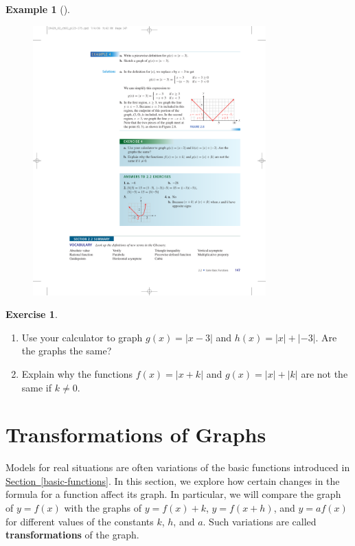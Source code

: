 \documentclass[10pt,]{book}
\newcommand{\terminology}[1]{\textbf{#1}}
\theoremstyle{plain}
\theoremstyle{definition}
\theoremstyle{definition}
\theoremstyle{definition}
\newtheorem{example}[theorem]{Example}
\theoremstyle{definition}
\theoremstyle{definition}
\newtheorem{exercise}[theorem]{Exercise}
\numberwithin{equation}{section}
\newcommand\abs[1]{\left|#1\right|}
\begin{document}
\begin{example}[]
\begin{enumerate}[label=*\alph**]
            \leavevmode%
\begin{figure}
\centering
\includegraphics[width=0.80\textwidth,]{images/fig-piecewise2.pdf}\caption{\label{fig-piecewise2}}
\end{figure}
\end{enumerate}
\end{example}
\begin{exercise}\label{exercise-piecewise2}
\leavevmode%
\begin{enumerate}[label=*\alph**]
\item\hypertarget{li-284}{}Use your calculator to graph \(g(x) =\abs{x−3}\) and \(h(x) =\abs{x} + \abs{−3}\). Are the graphs the same?\item\hypertarget{li-285}{}Explain why the functions \(f (x) =\abs{x + k}\) and \(g(x) =\abs{x} + \abs{k}\) are not the same if \(k\ne 0\).
        \end{enumerate}
\end{exercise}
\typeout{************************************************}
\typeout{************************************************}
\section[Transformations of Graphs]{Transformations of Graphs}\label{transformations}

    Models for real situations are often variations of the basic functions introduced in \hyperref[basic-functions]{Section~\ref{basic-functions}}. In this section, we explore how certain changes in the formula for a function affect its graph. In particular, we will compare the graph of \(y = f (x)\) with the graphs of \(y = f (x) + k\), \(y = f (x + h)\), and \(y = a f (x)\) for different values of the constants \(k\), \(h\), and \(a\). Such variations are called \terminology{transformations} of the graph.
%
\typeout{************************************************}
\typeout{************************************************}
\end{document}
